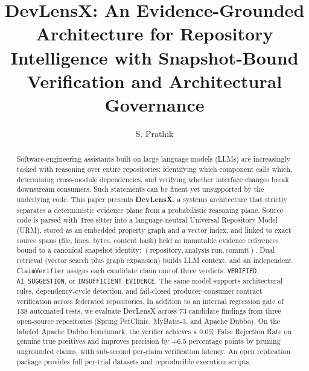 \documentclass[runningheads]{llncs}
\begin{document}
\title{DevLensX: An Evidence-Grounded Architecture for Repository Intelligence with Snapshot-Bound Verification and Architectural Governance}

\author{S. Prathik}


\maketitle

\begin{abstract}
Software-engineering assistants built on large language models (LLMs) are increasingly tasked with reasoning over entire repositories: identifying which component calls which, determining cross-module dependencies, and verifying whether interface changes break downstream consumers. Such statements can be fluent yet unsupported by the underlying code. This paper presents \textbf{DevLensX}, a systems architecture that strictly separates a deterministic evidence plane from a probabilistic reasoning plane. Source code is parsed with Tree-sitter into a language-neutral Universal Repository Model (URM), stored as an embedded property graph and a vector index, and linked to exact source spans (file, lines, bytes, content hash) held as immutable evidence references bound to a canonical snapshot identity: $(\text{repository}, \text{analysis run}, \text{commit})$. Dual retrieval (vector search plus graph expansion) builds LLM context, and an independent \texttt{ClaimVerifier} assigns each candidate claim one of three verdicts: \texttt{VERIFIED}, \texttt{AI\_SUGGESTION}, or \texttt{INSUFFICIENT\_EVIDENCE}. The same model supports architectural rules, dependency-cycle detection, and fail-closed producer--consumer contract verification across federated repositories. In addition to an internal regression gate of 138 automated tests, we evaluate DevLensX across 73 candidate findings from three open-source repositories (Spring PetClinic, MyBatis-3, and Apache Dubbo). On the labeled Apache Dubbo benchmark, the verifier achieves a $0.0\%$ False Rejection Rate on genuine true positives and improves precision by $+6.5$ percentage points by pruning ungrounded claims, with sub-second per-claim verification latency. An open replication package provides full per-trial datasets and reproducible execution scripts.

\end{abstract}
\end{document}
